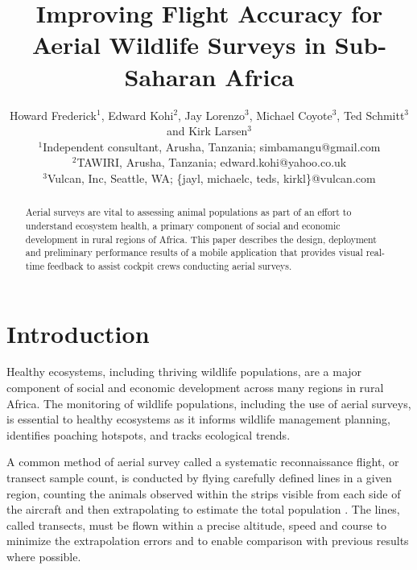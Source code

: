 \documentclass{sig-alternate-2013}
\begin{document}
\title{Improving Flight Accuracy for Aerial Wildlife Surveys in Sub-Saharan Africa}
\author{
Howard Frederick$^{1}$, Edward Kohi$^{2}$, Jay Lorenzo$^{3}$, Michael Coyote$^{3}$, Ted Schmitt$^{3}$ and Kirk Larsen$^{3}$\\	
\affaddr$^{1}$Independent consultant, Arusha, Tanzania; simbamangu@gmail.com \\
\affaddr$^{2}$TAWIRI, Arusha, Tanzania; edward.kohi@yahoo.co.uk  \\
\affaddr$^{3}$Vulcan, Inc, Seattle, WA; \{jayl, michaelc, teds, kirkl\}@vulcan.com
}
\maketitle

\begin{abstract}
Aerial surveys are vital to assessing animal populations as part of an effort to understand ecosystem health, a primary component of social and economic development in rural regions of Africa. This paper describes the design, deployment and preliminary performance results of a mobile application that provides visual real-time feedback to assist cockpit crews conducting aerial surveys.
\end{abstract}



\section{Introduction}
Healthy ecosystems, including thriving wildlife populations, are a major component of social and economic development across many regions in rural Africa. The monitoring of wildlife populations, including the use of aerial surveys, is essential to healthy ecosystems as it informs wildlife management planning, identifies poaching hotspots, and tracks ecological trends.

A common method of aerial survey called a systematic reconnaissance flight, or transect sample count, is conducted by flying carefully defined lines in a given region, counting the animals observed within the strips visible from each side of the aircraft and then extrapolating to estimate the total population \cite{mike}.  The lines, called transects, must be flown within a precise altitude, speed and course to minimize the extrapolation errors and to enable comparison with previous results where possible.  
\end{document}
